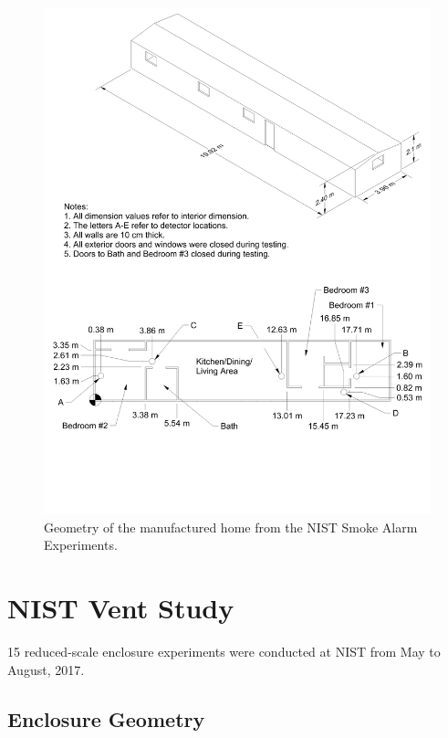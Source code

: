 \begin{figure}[p]
\includegraphics[width=\textwidth]{FIGURES/NIST_Smoke_Alarms/Manufactured_Home_Drawing}
\caption[Geometry of the manufactured home from the NIST Smoke Alarm Experiments]{Geometry of the manufactured home from the NIST Smoke Alarm Experiments.}
\label{NIST_Smoke_Alarms_Drawing}
\end{figure}

\clearpage


\section{NIST Vent Study}

15 reduced-scale enclosure experiments were conducted at NIST from May to August, 2017. 
\subsection{Enclosure Geometry}
\label{Enclosure_Geometry}

